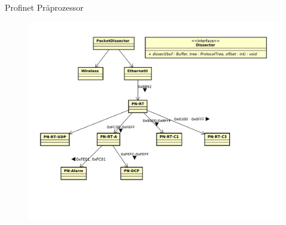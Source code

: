 \begin{frame}{Profinet Präprozessor}
    \begin{figure}
    	\centering
    	\includegraphics[width=\textwidth]{./images/dissector/6.pdf}
    \end{figure}
\end{frame}

